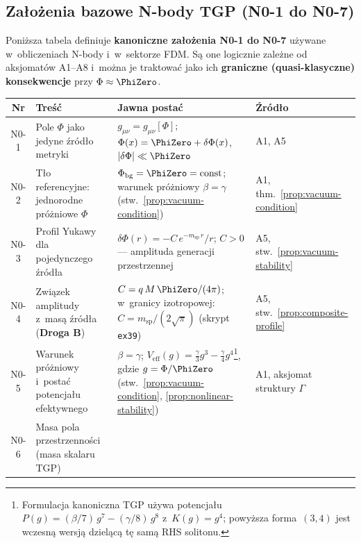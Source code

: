 \subsection{Za\l{}o\.zenia bazowe N-body TGP (N0-1 do N0-7)}
\label{ssec:N0-lista}

Poni\.zsza tabela definiuje \textbf{kanoniczne za\l{}o\.zenia N0-1 do N0-7}
u\.zywane w~obliczeniach N-body i~w~sektorze FDM.
S\k{a} one logicznie zale\.zne od aksjomat\'ow A1--A8 i~mo\.zna je traktowa\'c
jako ich \textbf{graniczne (quasi-klasyczne) konsekwencje} przy $\Phi \approx \PhiZero$.

\begin{center}
\begin{tabular}{@{}clp{7.5cm}l@{}}
\toprule
\textbf{Nr} & \textbf{Tre\'s\'c}
  & \textbf{Jawna posta\'c} & \textbf{\'Zr\'od\l{}o} \\
\midrule
N0-1
  & Pole $\Phi$ jako jedyne \'zr\'od\l{}o metryki
  & $g_{\mu\nu} = g_{\mu\nu}[\Phi]$;
    $\Phi(x) = \PhiZero + \delta\Phi(x)$,
    $|\delta\Phi| \ll \PhiZero$
  & A1, A5 \\[4pt]
N0-2
  & T\l{}o referencyjne: jednorodne pr\'o\.zniowe $\Phi$
  & $\Phi_{\mathrm{bg}} = \PhiZero = \mathrm{const}$;
    warunek pr\'o\.zniowy $\beta = \gamma$
    (stw.~\ref{prop:vacuum-condition})
  & A1, thm.~\ref{prop:vacuum-condition} \\[4pt]
N0-3
  & Profil Yukawy dla pojedynczego \'zr\'od\l{}a
  & $\delta\Phi(r) = -C\,e^{-m_{\mathrm{sp}}\,r}/r$;
    $C > 0$ --- amplituda generacji przestrzennej
  & A5, stw.~\ref{prop:vacuum-stability} \\[4pt]
N0-4
  & Zwi\k{a}zek amplitudy z~mas\k{a} \'zr\'od\l{}a
    (\textbf{Droga B})
  & $C = q\,M\,\PhiZero / (4\pi)$;
    w~granicy izotropowej: $C = m_{\mathrm{sp}}/(2\sqrt{\pi})$
    (skrypt \texttt{ex39})
  & A5, stw.~\ref{prop:composite-profile} \\[4pt]
N0-5
  & Warunek pr\'o\.zniowy i~posta\'c potencja\l{}u efektywnego
  & $\beta = \gamma$;
    $V_{\mathrm{eff}}(g) = \frac{\gamma}{3}g^3 - \frac{\gamma}{4}g^4$\footnote{Formulacja kanoniczna TGP u\.zywa potencja\l{}u $P(g) = (\beta/7)\,g^7 - (\gamma/8)\,g^8$ z~$K(g) = g^4$; powy\.zsza forma~$(3,4)$ jest wczesn\k{a} wersj\k{a} dziel\k{a}c\k{a} t\k{e} sam\k{a} RHS solitonu.},
    gdzie $g = \Phi/\PhiZero$
    (stw.~\ref{prop:vacuum-condition}, \ref{prop:nonlinear-stability})
  & A1, aksjomat struktury $\Gamma$ \\[4pt]
N0-6
  & Masa pola przestrzenno\'sci (masa skalaru TGP)

\end{tabular}
\end{center}
